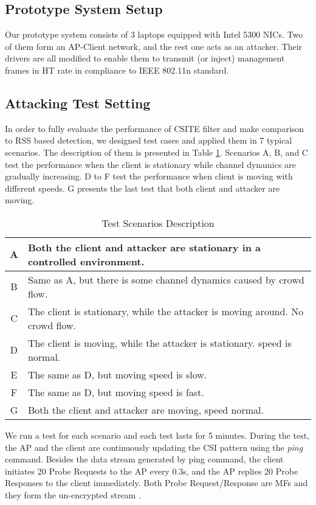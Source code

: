 \documentclass[conference]{IEEEtran}
\begin{document}
\subsection{Prototype System Setup}
Our prototype system consists of 3 laptops equipped with Intel 5300 NICs. Two of them form an AP-Client network, and the rest one acts as an attacker. Their drivers are all modified to enable them to transmit (or inject) management frames in HT rate in compliance to IEEE 802.11n standard.

\subsection{Attacking Test Setting}


In order to fully evaluate the performance of CSITE filter and make comparison to RSS based detection, we designed test cases and applied them in 7 typical scenarios. The description of them is presented in Table \ref{tab:scenarios}. Scenarios A, B, and C test the performance when the client is stationary while channel dynamics are gradually increasing. D to F test the performance when client is moving with different speeds. G presents the last test that both client and attacker are moving.


\begin{table}[!h]
\caption{ Test Scenarios Description}
\label{tab:scenarios}
\begin{center}
\begin{tabular}{|c|p{6.5cm}|}
\hline
A & Both the client and attacker are stationary in a controlled environment.\\ \hline
B & Same as A, but there is some channel dynamics caused by crowd flow.  \\ \hline
C & The client is stationary, while the attacker is moving around. No crowd flow. \\ \hline
D & The client is moving, while the attacker is stationary. speed is normal. \\ \hline
E & The same as D, but moving speed is slow. \\ \hline
F & The same as D, but moving speed is fast.\\ \hline
G & Both the client and attacker are moving, speed normal. \\ \hline
\end{tabular}
\end{center}
\end{table}

We run a test for each scenario and each test lasts for 5 minutes. During the test, the AP and the client are continuously updating the CSI pattern using the \textit{ping} command. Besides the data stream generated by ping command, the client initiates 20 Probe Requests to the AP every 0.3s, and the AP replies 20 Probe Responses to the client immediately. Both Probe Request/Response are MFs and they form the un-encrypted stream .
\end{document}
